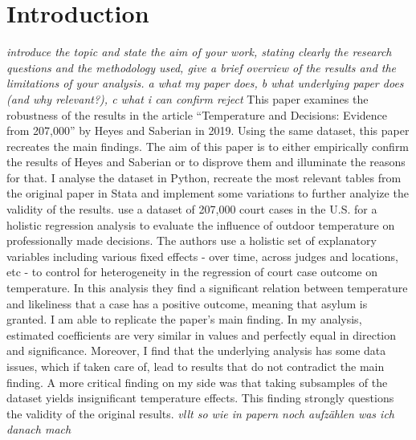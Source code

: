 \documentclass[11pt]{article}
\begin{document}
	\section{Introduction}
	\textit{introduce the topic and state the aim of your work, stating clearly the research questions and the methodology used, give a brief overview of the results and the	limitations of your analysis. a what my paper does, b what underlying paper does (and why relevant?), c what i can confirm reject}
	\newline This paper examines the robustness of the results in the article “Temperature and Decisions: Evidence from 207,000” by Heyes and Saberian in 2019. Using the same dataset, this paper recreates the main findings. The aim of this paper is to either empirically confirm the results of Heyes and Saberian or to disprove them and illuminate the reasons for that. I analyse the dataset in Python, recreate the most relevant tables from the original paper in Stata and implement some variations to further analyize the validity of the results.
	\newline \cite{Heyes.2019} use a dataset of 207,000 court cases in the U.S. for a holistic regression analysis to evaluate the influence of outdoor temperature on professionally made decisions. The authors use a holistic set of explanatory variables including various fixed effects - over time, across judges and locations, etc - to control for heterogeneity in the regression of court case outcome on temperature. In this analysis they find a significant relation between temperature and likeliness that a case has a positive outcome, meaning that asylum is granted.
	\newline I am able to replicate the paper’s main finding. In my analysis, estimated coefficients are very similar in values and perfectly equal in direction and significance. Moreover, I find that the underlying analysis has some data issues, which if taken care of, lead to results that do not contradict the main finding. A more critical finding on my side was that taking subsamples of the dataset yields insignificant temperature effects. This finding strongly questions the validity of the original results. \textit{vllt so wie in papern noch aufzählen was ich danach mach}
\end{document}
